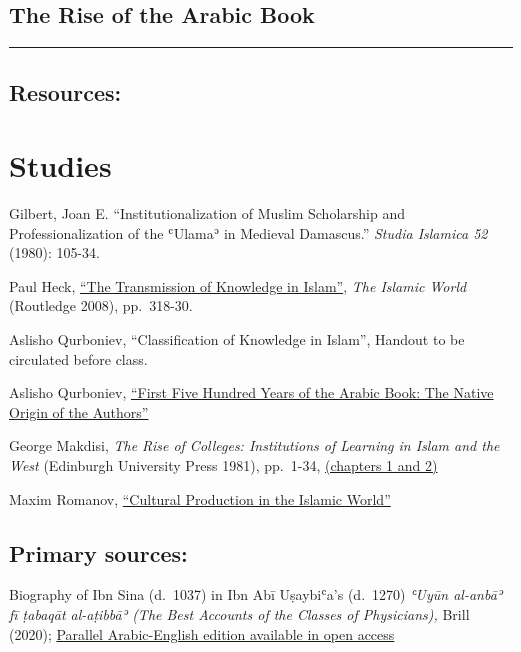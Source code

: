 \documentclass[
]{book}
\begin{document}
\hypertarget{the-rise-of-the-arabic-book}{%
\section{The Rise of the Arabic Book}\label{the-rise-of-the-arabic-book}}

\begin{center}\rule{0.5\linewidth}{0.5pt}\end{center}

\hypertarget{resources}{%
\section{Resources:}\label{resources}}

\hypertarget{studies}{%
\chapter{Studies}\label{studies}}

Gilbert, Joan E. ``Institutionalization of Muslim Scholarship and Professionalization of the ʿUlamaʾ in Medieval Damascus.'' \emph{Studia Islamica 52} (1980): 105-34.

Paul Heck, \href{https://tinyurl.com/TransmissionKnowledge}{``The Transmission of Knowledge in Islam''}, \emph{The Islamic World} (Routledge 2008), pp.~318-30.

Aslisho Qurboniev, ``Classification of Knowledge in Islam'', Handout to be circulated before class.

Aslisho Qurboniev, \href{https://tinyurl.com/firstfivehundred}{``First Five Hundred Years of the Arabic Book: The Native Origin of the Authors''}

George Makdisi, \emph{The Rise of Colleges: Institutions of Learning in Islam and the West} (Edinburgh University Press 1981), pp.~1-34, \href{https://tinyurl.com/Riseof-Colleges}{(chapters 1 and 2)}

Maxim Romanov, \href{https://alraqmiyyat.github.io/2017/10-14.html}{``Cultural Production in the Islamic World''}

\hypertarget{primary-sources}{%
\section{Primary sources:}\label{primary-sources}}

Biography of Ibn Sina (d.~1037) in Ibn Abī Uṣaybiʿa's (d.~1270) \emph{ʿUyūn al-anbāʾ fī ṭabaqāt al-aṭibbāʾ (The Best Accounts of the Classes of Physicians),} Brill (2020); \href{https://scholarlyeditions.brill.com/reader/urn:cts:arabicLit:0668IbnAbiUsaibia.Tabaqatalatibba.lhom-tr-eng1:11.13/}{Parallel Arabic-English edition available in open access}
\end{document}
